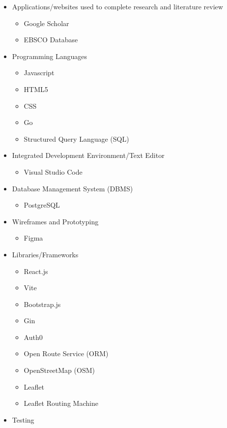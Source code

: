 \begin{itemize}
    \item Applications/websites used to complete research and literature review
    \begin{itemize}
        \item Google Scholar
        \item EBSCO Database
    \end{itemize}
    \item Programming Languages
    \begin{itemize}
        \item Javascript
        \item HTML5
        \item CSS
        \item Go
        \item Structured Query Language (SQL)
    \end{itemize}
    \item Integrated Development Environment/Text Editor
    \begin{itemize}
        \item Visual Studio Code
    \end{itemize}
    \item Database Management System (DBMS)
    \begin{itemize}
        \item PostgreSQL
    \end{itemize}
    \item Wireframes and Prototyping
    \begin{itemize}
        \item Figma
    \end{itemize}
    \item Libraries/Frameworks
    \begin{itemize}
        \item React.js
        \item Vite
        \item Bootstrap.js
        \item Gin
        \item Auth0
        \item Open Route Service (ORM)
        \item OpenStreetMap (OSM)
        \item Leaflet
        \item Leaflet Routing Machine
    \end{itemize}
    \item Testing

\end{itemize}
